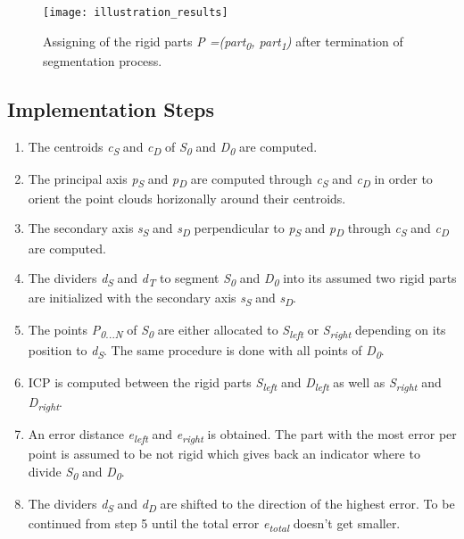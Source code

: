  \begin{figure}
 	\centering
 	\texttt{[image: illustration\_results]}
 	\caption{Assigning of the rigid parts \textit{P =(part\textsubscript{0}, part\textsubscript{1})} after termination of segmentation process.}
 	\label{fig:dc_results_2p}
 \end{figure}
 
 \subsection{Implementation Steps}
 
 \begin{enumerate}
 	\item The centroids \textit{c\textsubscript{S}} and \textit{c\textsubscript{D}} of \textit{S\textsubscript{0}} and \textit{D\textsubscript{0}} are computed.
 	
 	\item The principal axis \textit{p\textsubscript{S}} and \textit{p\textsubscript{D}}  are computed through \textit{c\textsubscript{S}} and \textit{c\textsubscript{D}} in order to orient the point clouds horizonally around their centroids.
 	
 	\item The secondary axis \textit{s\textsubscript{S}} and \textit{s\textsubscript{D}} perpendicular to \textit{p\textsubscript{S}} and \textit{p\textsubscript{D}} through \textit{c\textsubscript{S}} and \textit{c\textsubscript{D}} are computed.
 	
 	\item The dividers \textit{d\textsubscript{S}} and \textit{d\textsubscript{T}} to segment \textit{S\textsubscript{0}} and \textit{D\textsubscript{0}} into its assumed two rigid parts are initialized with the secondary axis \textit{s\textsubscript{S}} and \textit{s\textsubscript{D}}.
 	
 	\item The points \textit{P\textsubscript{0...N}} of \textit{S\textsubscript{0}}  are either allocated to \textit{S\textsubscript{left}} or \textit{S\textsubscript{right}} depending on its position to \textit{d\textsubscript{S}}. The same procedure is done with all points of \textit{D\textsubscript{0}}.
 	
 	\item ICP is computed between the rigid parts \textit{S\textsubscript{left}} and \textit{D\textsubscript{left}} as well as \textit{S\textsubscript{right}} and \textit{D\textsubscript{right}}.
 	
 	\item An error distance \textit{e\textsubscript{left}} and \textit{e\textsubscript{right}} is obtained. The part with the most error per point is assumed to be not rigid which gives back an indicator where to divide \textit{S\textsubscript{0}} and \textit{D\textsubscript{0}}.
 	
 	\item The dividers \textit{d\textsubscript{S}} and \textit{d\textsubscript{D}} are shifted to the direction of the highest error. To be continued from step 5 until the total error \textit{e\textsubscript{total}} doesn't get smaller.
 \end{enumerate}

